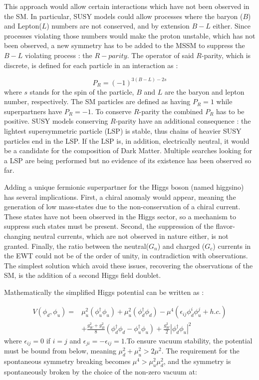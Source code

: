 This approach would allow certain interactions which have not been observed in the SM. In particular, SUSY models could allow processes where the baryon ($B$) and Lepton($L$) numbers are not conserved, and by extension $B - L$ either. Since processes violating those numbers would make the proton unstable, which has not been observed, a new symmetry has to be added to the MSSM to suppress the $B-L$ violating process : the $R-parity$. The operator of said $R$-parity, which is discrete, is defined for each particle in an interaction as :

\begin{equation}
    P_R = (-1)^{3(B-L)-2s}
\end{equation}
where $s$ stands for the spin of the particle, $B$ and $L$ are the baryon and lepton number, respectively. The SM particles are defined as having $P_R = 1$ while superpartners have $P_R = -1$. To conserve $R$-parity the combined $P_R$ has to be positive. SUSY models conserving $R$-parity have an additional consequence : the lightest supersymmetric particle (LSP) is stable, thus chains of heavier SUSY particles end in the LSP. If the LSP is, in addition, electrically neutral, it would be a candidate for the composition of Dark Matter. Multiple searches looking for a LSP are being performed but no evidence of its existence has been observed so far.\newline

Adding a unique fermionic superpartner for the Higgs boson (named higgsino) has several implications. First, a chiral anomaly would appear, meaning the generation of low mass-states due to the non-conservation of a chiral current. These states have not been observed in the Higgs sector, so a mechanism to suppress such states must be present. Second, the suppression of the flavor-changing neutral currents, which are not observed in nature either, is not granted. Finally, the ratio between the neutral($G_n$) and charged ($G_c$) currents in the EWT could not be of the order of unity, in contradiction with observations. The simplest solution which avoid these issues, recovering the observations of the SM, is the addition of a second Higgs field doublet.

Mathematically the simplified Higgs potential can be written as \cite{Nagashima:2014tva}:

\begin{align}
    V(\phi_d , \phi_u) = & \mu^{2}_u (\phi^{\dagger}_u \phi_u) + \mu^{2}_u (\phi^{\dagger}_d \phi_d) - \mu^{4}(\epsilon_{ij}\phi^{i}_d \phi^{j}_u + h.c.) \\ & + \frac{g^{2}_W + g^{2}_B}{8}(\phi^{\dagger}_d \phi_d - \phi^{\dagger}_u \phi_u) + \frac{g^{2}_W}{2} | \phi^{\dagger}_d \phi_u |^2
\end{align}
where $\epsilon_{ij} = 0$ if $i = j$ and $\epsilon_{ji} = -\epsilon_{ij} = 1$.To ensure vacuum stability, the potential must be bound from below, meaning $\mu_{d}^2 + \mu_{u}^2 > 2\mu^2$. The requirement for the spontaneous symmetry breaking becomes $\mu^4 > \mu_{u}^2 \mu_{d}^2$, and the symmetry is spontaneously broken by the choice of the non-zero vacuum at:

